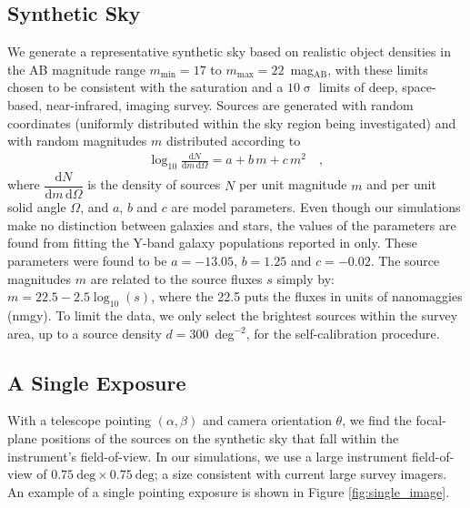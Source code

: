 \documentclass[preprint,pdftex]{aastex}
\newcommand{\dd}{\text{d}}
\begin{document}
\subsection{Synthetic Sky}
We generate a representative synthetic sky based on realistic object densities in the AB magnitude range $m_\text{min} = 17$ to $m_\text{max} = 22$~mag$_\text{AB}$, with these limits chosen to be consistent with the saturation and a $10\upsigma{}$ limits of deep, space-based, near-infrared, imaging survey. Sources are generated with random coordinates (uniformly distributed within the sky region being investigated) and with random magnitudes $m$ distributed according to
\begin{eqnarray*}
\log_{10} \frac{\dd N}{\dd m \, \dd \Omega} = a + b\,m + c\,m^2 \label{eqn:power_law} \quad , 
\end{eqnarray*}
where $\dfrac{\dd N}{\dd m \, \dd  \Omega}$  is the density of sources $N$ per unit magnitude $m$ and per unit solid angle $\Omega$, and $a$, $b$ and $c$ are model parameters. Even though our simulations make no distinction between galaxies and stars, the values of the parameters are found from fitting the Y-band galaxy populations reported in \citet{win11} only. These parameters were found to be $a = -13.05$, $b = 1.25$ and $c = -0.02$. The source magnitudes $m$ are related to the source fluxes $s$ simply by: $m = 22.5 - 2.5\log_{10}(s)$, where the 22.5 puts the fluxes in units of nanomaggies (nmgy). To limit the data, we only select the brightest sources within the survey area, up to a source density $d=300$~deg$^{-2}$, for the self-calibration procedure.

\subsection{A Single Exposure}
\label{sec:single_exposure}
With a telescope pointing $(\alpha, \beta)$ and camera orientation $\theta$, we find the focal-plane positions of the sources on the synthetic sky that fall within the instrument's field-of-view. In our simulations, we use a large instrument field-of-view of $0.75~ \text{deg} \times 0.75~\text{deg}$; a size consistent with current large survey imagers. An example of a single pointing exposure is shown in Figure \ref{fig:single_image}.
\end{document}
